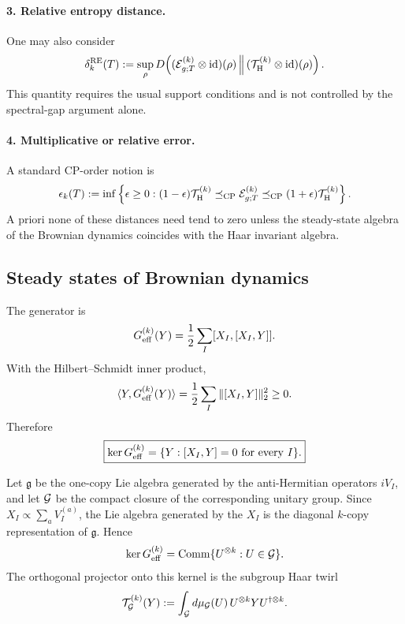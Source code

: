 \documentclass{article}
\theoremstyle{definition}
\begin{document}
\paragraph{3. Relative entropy distance.}
One may also consider
\begin{equation}
    \delta_k^{\rm RE}(T)
    :=\sup_\rho
      D\!\left(
        ({\cal E}_{g;T}^{(k)}\otimes{\rm id})(\rho)
        \,\middle\|\,
        ({\cal T}_{\rm H}^{(k)}\otimes{\rm id})(\rho)
      \right).
\end{equation}
This quantity requires the usual support conditions and is not controlled
by the spectral-gap argument alone.

\paragraph{4. Multiplicative or relative error.}
A standard CP-order notion is
\begin{equation}
    \epsilon_k(T)
    :=\inf\left\{
      \epsilon\ge0:
      (1-\epsilon){\cal T}_{\rm H}^{(k)}
      \preceq_{\rm CP}{\cal E}_{g;T}^{(k)}
      \preceq_{\rm CP}
      (1+\epsilon){\cal T}_{\rm H}^{(k)}
    \right\}.
\end{equation}
A priori none of these distances need tend to zero unless the steady-state
algebra of the Brownian dynamics coincides with the Haar invariant algebra.

\subsection{Steady states of Brownian dynamics}

The generator is
\begin{equation}
    G_{\rm eff}^{(k)}(Y)
    =\frac12\sum_I[X_I,[X_I,Y]].
\end{equation}
With the Hilbert--Schmidt inner product,
\begin{equation}
    \langle Y,G_{\rm eff}^{(k)}(Y)\rangle
    =\frac12\sum_I\|[X_I,Y]\|_2^2\ge0.
\end{equation}
Therefore
\begin{equation}
    \boxed{
    \ker G_{\rm eff}^{(k)}
    =\{Y:[X_I,Y]=0\ \text{for every }I\}.
    }
\end{equation}

Let $\mathfrak g$ be the one-copy Lie algebra generated by the
anti-Hermitian operators $iV_I$, and let ${\cal G}$ be the compact closure
of the corresponding unitary group.  Since
$X_I\propto\sum_aV_I^{(a)}$, the Lie algebra generated by the $X_I$ is the
diagonal $k$-copy representation of $\mathfrak g$.  Hence
\begin{equation}
    \ker G_{\rm eff}^{(k)}
    ={\rm Comm}\{U^{\otimes k}:U\in{\cal G}\}.
\end{equation}
The orthogonal projector onto this kernel is the subgroup Haar twirl
\begin{equation}
    {\cal T}_{\cal G}^{(k)}(Y)
    :=\int_{\cal G}d\mu_{\cal G}(U)\,
      U^{\otimes k}YU^{\dagger\otimes k}.
\end{equation}
\end{document}
